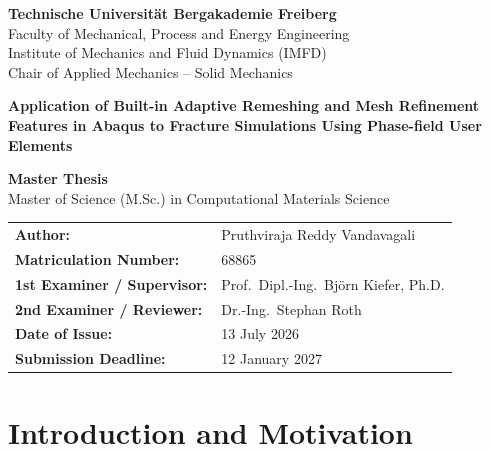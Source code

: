 \documentclass[11pt,a4paper]{report}
\begin{document}
\begin{titlepage}
\centering
{\large\bfseries Technische Universit\"at Bergakademie Freiberg}\\[0.4em]
{\large Faculty of Mechanical, Process and Energy Engineering}\\[0.3em]
{\large Institute of Mechanics and Fluid Dynamics (IMFD)}\\[0.2em]
{\large Chair of Applied Mechanics -- Solid Mechanics}\\[2.5em]

{\LARGE\bfseries Application of Built-in Adaptive Remeshing and Mesh
Refinement Features in Abaqus to Fracture Simulations Using Phase-field
User Elements\par}
\vspace{1.5em}
{\large\bfseries Master Thesis}\\[0.4em]
{\large Master of Science (M.Sc.) in Computational Materials Science}\\[2.2em]

\begin{tabular}{@{}ll@{}}
\textbf{Author:} & Pruthviraja Reddy Vandavagali \\
\textbf{Matriculation Number:} & 68865 \\
\textbf{1st Examiner / Supervisor:} & Prof.\ Dipl.-Ing.\ Bj\"orn Kiefer, Ph.D. \\
\textbf{2nd Examiner / Reviewer:} & Dr.-Ing.\ Stephan Roth \\
\textbf{Date of Issue:} & 13 July 2026 \\
\textbf{Submission Deadline:} & 12 January 2027 \\
\end{tabular}
\end{titlepage}

\tableofcontents
\clearpage
\listoffigures
\vspace{1.5em}
\listoftables
\clearpage
{}

\chapter{Introduction and Motivation}
\label{chap:introduction}
\end{document}
